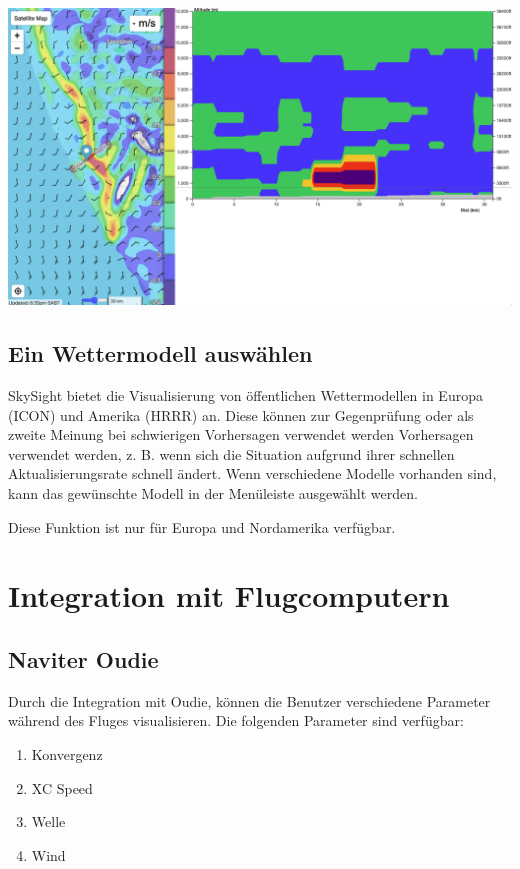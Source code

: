 \documentclass[11pt,a4paper]{article}
\begin{document}
\begin{center}
\includegraphics[width=14cm]{images/convergence_section.png}
\end{center}

\subsection{Ein Wettermodell auswählen}

SkySight bietet die Visualisierung von öffentlichen Wettermodellen in Europa (ICON) und
Amerika (HRRR) an. Diese können zur Gegenprüfung oder als zweite Meinung bei schwierigen Vorhersagen verwendet werden
Vorhersagen verwendet werden, z. B. wenn sich die Situation aufgrund ihrer schnellen Aktualisierungsrate schnell ändert.
Wenn verschiedene Modelle vorhanden sind, kann das gewünschte Modell in der Menüleiste ausgewählt werden.

Diese Funktion ist nur für Europa und Nordamerika verfügbar.

\section{Integration mit Flugcomputern}
\subsection{Naviter Oudie}\label{subsec:oudie}
Durch die Integration mit Oudie, können die Benutzer verschiedene Parameter während des Fluges visualisieren. Die folgenden Parameter sind verfügbar:
\begin{enumerate}
\item Konvergenz
\item XC Speed
\item Welle
\item Wind
\end{enumerate}
\end{document}
